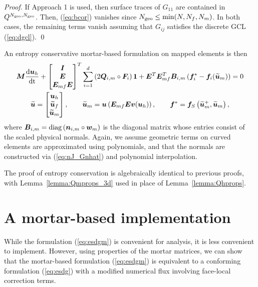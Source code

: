 \documentclass{svjour3}                     %
\renewcommand{\tilde}{\widetilde}
\newcommand{\diag}[1]{{\rm diag}\LRp{#1}}
\newcommand{\td}[2]{\frac{{\rm d}#1}{{\rm d}{\rm #2}}}
\newcommand{\LRp}[1]{\left( #1 \right)}
\renewcommand{\note}[1]{{\color{blue}{#1}}}
\begin{document}
\begin{proof}
If Approach 1 \cite{kopriva2006metric} is used, then surface traces of $G_{11}$ are contained in $Q^{N_{\rm geo},N_{\rm geo}}$.  Then, (\ref{eq:bcor}) vanishes since $N_{\rm geo} \leq \min(N,N_f,N_m)$.  In both cases, the remaining terms vanish assuming that $G_{ij}$ satisfies the discrete GCL (\ref{eq:dgcl}).
\qed\end{proof}


An entropy conservative mortar-based formulation on mapped elements is then 
\begin{gather}
{\bm{M}}\td{\bm{u}_h}{t} + \begin{bmatrix} \bm{I} \\ \bm{E} \\ \bm{E}_{mf}\bm{E} \end{bmatrix}^T
\sum_{i=1}^d \LRp{2{\bm{Q}}_{i,m} \circ \bm{F}_i}\bm{1} + \bm{E}^T\bm{E}_{mf}^T{\bm{B}}_{i,m}\LRp{\bm{f}_i^*-\bm{f}_i(\tilde{\bm{u}}_m)} = 0 \label{eq:esdgm}\\
\tilde{\bm{u}} = \begin{bmatrix}
\bm{u}_h\\
\tilde{\bm{u}}_f\\
\tilde{\bm{u}}_m
\end{bmatrix}, \qquad \tilde{\bm{u}}_m = \bm{u}\LRp{\bm{E}_{mf}\bm{E}\bm{v}(\bm{u}_h)}, \qquad \bm{f}^* = \bm{f}_S\LRp{\tilde{\bm{u}}_m^+,\tilde{\bm{u}}_m},
\end{gather}
where $\bm{B}_{i,m} = \diag{\bm{n}_{i,m}\circ \bm{w}_m}$ is the diagonal matrix whose entries consist of the scaled physical normals.  Again, we assume geometric terms on curved elements are approximated using polynomials, and that the normals are constructed via (\ref{eq:nJ_Gnhat}) and polynomial interpolation.  


The proof of entropy conservation is algebraically identical to previous proofs, with Lemma~\ref{lemma:Qmprops_3d} used in place of Lemma~\ref{lemma:Qhprops}.






\section{A mortar-based implementation}

While the formulation (\ref{eq:esdgm}) is convenient for analysis, it is less convenient to implement.  However, using properties of the mortar matrices, we can show that the mortar-based formulation (\ref{eq:esdgm}) is equivalent to a conforming formulation (\ref{eq:esdg}) with a modified numerical flux involving face-local correction terms.  
\end{document}
